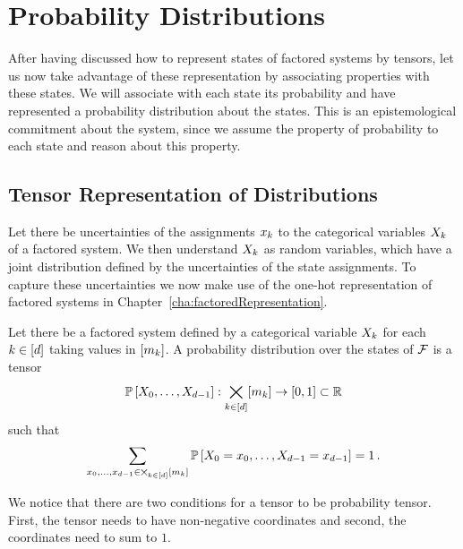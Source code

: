 \section{Probability Distributions}

After having discussed how to represent states of factored systems by tensors, let us now take advantage of these representation by associating properties with these states.
We will associate with each state its probability and have represented a probability distribution about the states.
This is an epistemological commitment about the system, since we assume the property of probability to each state and reason about this property.




\subsection{Tensor Representation of Distributions}

Let there be uncertainties of the assignments $x_{k}$ to the categorical variables $X_{k}$ of a factored system.
We then understand $X_{k}$ as random variables, which have a joint distribution defined by the uncertainties of the state assignments.
To capture these uncertainties we now make use of the one-hot representation of factored systems in Chapter~\ref{cha:factoredRepresentation}.

\begin{definition} %
	Let there be a factored system defined by a categorical variable $X_{k}$ for each $k\in[d]$ taking values in $[m_{k}]$. 
	A probability distribution over the states of $\mathcal{F}$ is a tensor
		\[ \mathbb{P}\left[X_{0},\ldots,X_{d-1}\right] : \bigtimes_{k\in[d]}[m_{k}] \rightarrow [0, 1] \subset \mathbb{R} \]
	such that
		\[ \sum_{x_{0},\ldots,x_{d-1}\in\bigtimes_{k\in[d]}[m_{k}]} \mathbb{P}\left[X_{0}=x_{0},\ldots,X_{d-1}=x_{d-1}\right] = 1 \, . \]
\end{definition}



We notice that there are two conditions for a tensor to be probability tensor.
First, the tensor needs to have non-negative coordinates and second, the coordinates need to sum to $1$.


